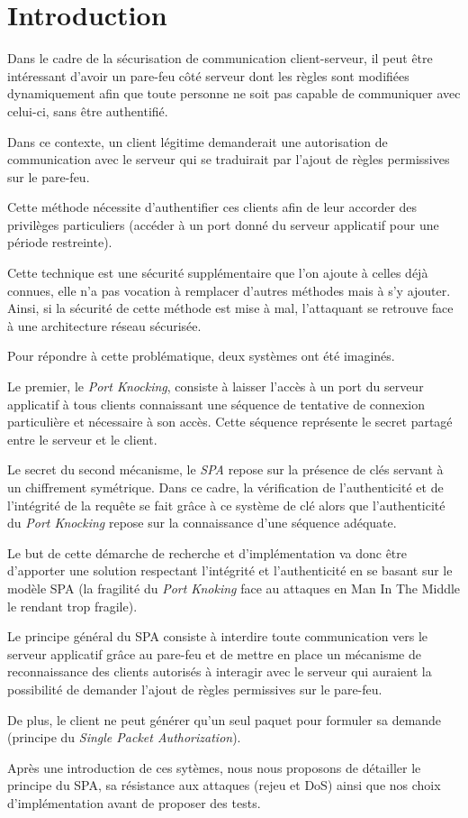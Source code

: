 \chapter*{Introduction}

Dans le cadre de la sécurisation de communication client-serveur, il peut être intéressant d'avoir un pare-feu côté serveur dont les règles sont modifiées dynamiquement afin que toute personne ne soit pas capable de communiquer avec celui-ci, sans être authentifié.

Dans ce contexte, un client légitime demanderait une autorisation de communication avec le serveur qui se traduirait par l'ajout de règles permissives sur le pare-feu.

Cette méthode nécessite d'authentifier ces clients afin de leur accorder des privilèges particuliers (accéder à un port donné du serveur applicatif pour une période restreinte).

Cette technique est une sécurité supplémentaire que l'on ajoute à celles déjà connues, elle n'a pas vocation à remplacer d'autres méthodes mais à s'y ajouter. Ainsi, si la sécurité de cette méthode est mise à mal, l'attaquant se retrouve face à une architecture réseau sécurisée.

Pour répondre à cette problématique, deux systèmes ont été imaginés.

Le premier, le \emph{Port Knocking}, consiste  à laisser l'accès à un port du serveur applicatif à tous clients connaissant une séquence de tentative de connexion particulière et nécessaire à son accès. Cette séquence représente le secret partagé entre le serveur et le client.

Le secret du second mécanisme, le \emph{SPA} repose sur la présence de clés servant à un chiffrement symétrique.
Dans ce cadre, la vérification de l'authenticité et de l'intégrité  de la requête se fait grâce à ce système de clé alors que l'authenticité du \emph{Port Knocking} repose sur la connaissance d'une séquence adéquate. 

Le but de cette démarche de recherche et d'implémentation va donc être d'apporter une solution respectant l'intégrité et l'authenticité en se basant sur le modèle SPA (la fragilité du \emph{Port Knoking} face au attaques en Man In The Middle le rendant trop fragile). 

Le principe général du SPA consiste à interdire toute communication vers le serveur applicatif grâce au pare-feu et de mettre en place un mécanisme de reconnaissance des clients autorisés à interagir avec le serveur qui auraient la possibilité de demander l'ajout de règles permissives sur le pare-feu.

De plus, le client ne peut générer qu'un seul paquet pour formuler sa demande (principe du \emph{Single Packet Authorization}).

Après une introduction de ces sytèmes, nous nous proposons de détailler le principe du SPA, sa résistance aux attaques (rejeu et DoS) ainsi que nos choix d'implémentation avant de proposer des tests.
